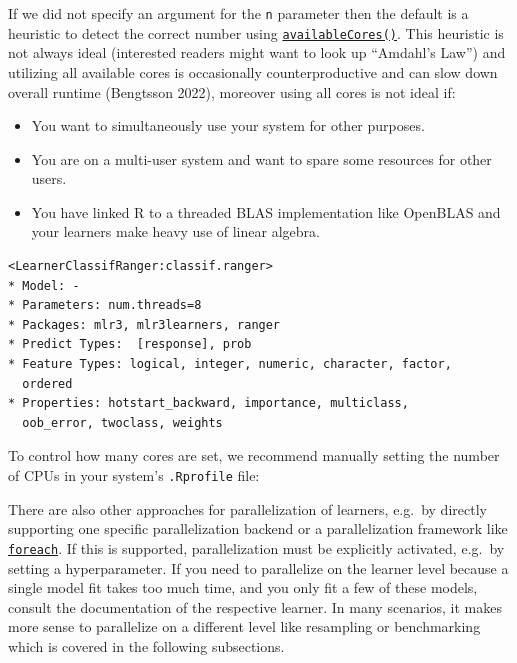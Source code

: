 If we did not specify an argument for the \texttt{n} parameter then the
default is a heuristic to detect the correct number using
\href{https://www.rdocumentation.org/packages/parallelly/topics/availableCores}{\texttt{availableCores()}}.
This heuristic is not always ideal (interested readers might want to
look up ``Amdahl's Law'') and utilizing all available cores is
occasionally counterproductive and can slow down overall runtime
(Bengtsson 2022), moreover using all cores is not ideal if:

\begin{itemize}
\tightlist
\item
  You want to simultaneously use your system for other purposes.
\item
  You are on a multi-user system and want to spare some resources for
  other users.
\item
  You have linked R to a threaded BLAS implementation like
  OpenBLAS and your learners make heavy use of linear algebra.
\end{itemize}

\begin{Shaded}
\begin{Highlighting}[]
\end{Highlighting}
\end{Shaded}

\begin{verbatim}
<LearnerClassifRanger:classif.ranger>
* Model: -
* Parameters: num.threads=8
* Packages: mlr3, mlr3learners, ranger
* Predict Types:  [response], prob
* Feature Types: logical, integer, numeric, character, factor,
  ordered
* Properties: hotstart_backward, importance, multiclass,
  oob_error, twoclass, weights
\end{verbatim}

To control how many cores are set, we recommend manually setting the
number of CPUs in your system's \texttt{.Rprofile} file:

\begin{Shaded}
\begin{Highlighting}[]
\NormalTok{(} \NormalTok{)}
\end{Highlighting}
\end{Shaded}

There are also other approaches for parallelization of learners, e.g.~by
directly supporting one specific parallelization backend or a
parallelization framework like
\href{https://cran.r-project.org/package=foreach}{\texttt{foreach}}. If
this is supported, parallelization must be explicitly activated, e.g.~by
setting a hyperparameter. If you need to parallelize on the learner
level because a single model fit takes too much time, and you only fit a
few of these models, consult the documentation of the respective
learner. In many scenarios, it makes more sense to parallelize on a
different level like resampling or benchmarking which is covered in the
following subsections.

